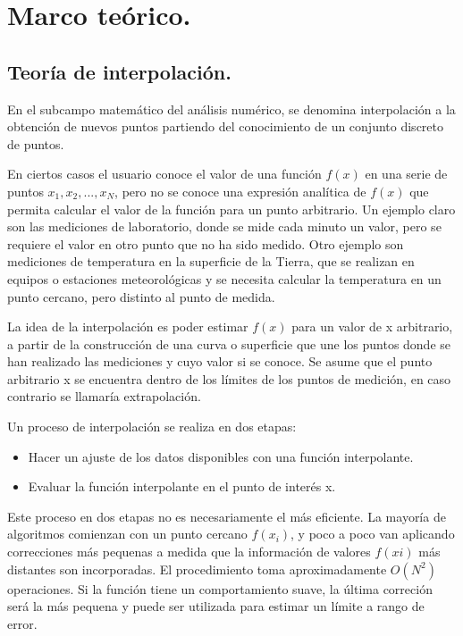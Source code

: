 \chapter{Marco te\'orico.}

\section{Teor\'ia de interpolaci\'on.}

\hspace{0.4cm} En el subcampo matem\'atico del an\'alisis num\'erico, se denomina interpolaci\'on a la obtenci\'on de nuevos puntos partiendo del conocimiento de un conjunto discreto de puntos.


\hspace{0.4cm} En ciertos casos el usuario conoce el valor de una funci\'on $f(x)$ en una serie de puntos $x_{1}, x_{2},..., x_{N}$, pero no se conoce una 
expresi\'on anal\'itica de $f(x)$ que permita calcular el valor de la funci\'on para un punto arbitrario. Un ejemplo claro son las mediciones de laboratorio, donde se mide cada minuto un valor, pero se requiere el valor en otro punto que no ha sido medido. Otro ejemplo son mediciones de temperatura en la superficie
de la Tierra, que se realizan en equipos o estaciones meteorol\'ogicas y se necesita calcular la temperatura en un punto cercano, pero distinto al punto de medida.

\hspace{0.4cm} La idea de la interpolaci\'on es poder estimar $f(x)$ para un valor de x arbitrario, a partir de la construcci\'on de una curva o superficie que une los puntos donde se han realizado las mediciones y cuyo valor si se conoce. Se asume que el punto arbitrario x se encuentra dentro de los l\'imites de los puntos de medici\'on, en caso contrario se llamar\'ia extrapolaci\'on. 

\hspace{0.4cm} Un proceso de interpolaci\'on se realiza en dos etapas:

\begin{itemize}
  \item Hacer un ajuste de los datos disponibles con una funci\'on interpolante.
  \item Evaluar la funci\'on interpolante en el punto de inter\'es x.
\end{itemize}


\hspace{0.4cm} Este proceso en dos etapas no es necesariamente el m\'as 
eficiente. La mayor\'ia de algoritmos comienzan con un punto cercano $f(x_{i})$, y poco a poco van aplicando correcciones m\'as pequenas a medida que la 
informaci\'on de valores $f(xi)$ m\'as distantes son incorporadas. El procedimiento toma aproximadamente $O(N^{2})$ operaciones. Si la funci\'on tiene un comportamiento suave, la \'ultima correci\'on ser\'a la m\'as pequena y puede ser utilizada para estimar un l\'imite a rango de error.

